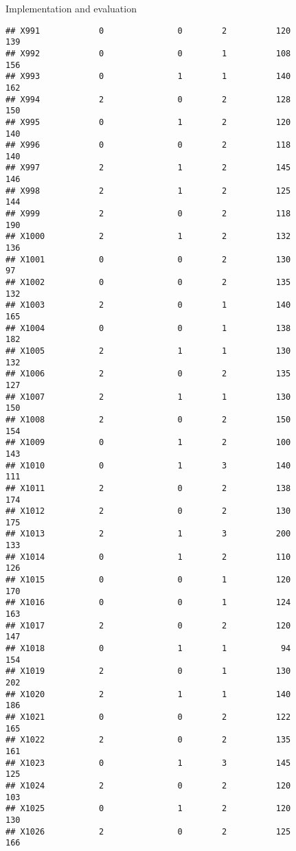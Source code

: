 \documentclass[
  ignorenonframetext,
]{beamer}
\begin{document}
\begin{frame}[fragile]{Implementation and evaluation}
\begin{verbatim}
## X991            0               0        2          120            139
## X992            0               0        1          108            156
## X993            0               1        1          140            162
## X994            2               0        2          128            150
## X995            0               1        2          120            140
## X996            0               0        2          118            140
## X997            2               1        2          145            146
## X998            2               1        2          125            144
## X999            2               0        2          118            190
## X1000           2               1        2          132            136
## X1001           0               0        2          130             97
## X1002           0               0        2          135            132
## X1003           2               0        1          140            165
## X1004           0               0        1          138            182
## X1005           2               1        1          130            132
## X1006           2               0        2          135            127
## X1007           2               1        1          130            150
## X1008           2               0        2          150            154
## X1009           0               1        2          100            143
## X1010           0               1        3          140            111
## X1011           2               0        2          138            174
## X1012           2               0        2          130            175
## X1013           2               1        3          200            133
## X1014           0               1        2          110            126
## X1015           0               0        1          120            170
## X1016           0               0        1          124            163
## X1017           2               0        2          120            147
## X1018           0               1        1           94            154
## X1019           2               0        1          130            202
## X1020           2               1        1          140            186
## X1021           0               0        2          122            165
## X1022           2               0        2          135            161
## X1023           0               1        3          145            125
## X1024           2               0        2          120            103
## X1025           0               1        2          120            130
## X1026           2               0        2          125            166

\end{verbatim}
\end{frame}
\end{document}
